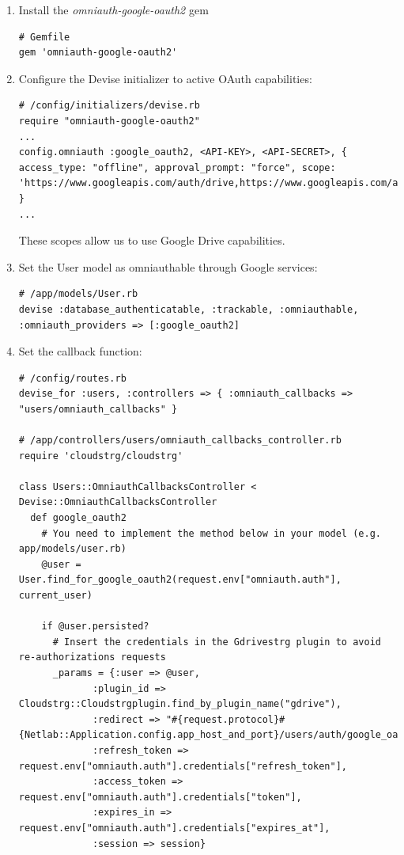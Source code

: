 \documentclass{article}
\begin{document}
\begin{enumerate}
\item Install the \textit{omniauth-google-oauth2} gem
\begin{verbatim}
# Gemfile
gem 'omniauth-google-oauth2'
\end{verbatim}

\item Configure the Devise initializer to active OAuth capabilities:
\begin{verbatim}
# /config/initializers/devise.rb
require "omniauth-google-oauth2"
...
config.omniauth :google_oauth2, <API-KEY>, <API-SECRET>, { access_type: "offline", approval_prompt: "force", scope: 'https://www.googleapis.com/auth/drive,https://www.googleapis.com/auth/drive.file,https://www.googleapis.com/auth/userinfo.email,https://www.googleapis.com/auth/userinfo.profile' }
...
\end{verbatim}

These scopes allow us to use Google Drive capabilities.

\item Set the User model as omniauthable through Google services:
\begin{verbatim}
# /app/models/User.rb
devise :database_authenticatable, :trackable, :omniauthable, :omniauth_providers => [:google_oauth2]
\end{verbatim}

\item Set the callback function:
\begin{verbatim}
# /config/routes.rb
devise_for :users, :controllers => { :omniauth_callbacks => "users/omniauth_callbacks" }

# /app/controllers/users/omniauth_callbacks_controller.rb
require 'cloudstrg/cloudstrg'

class Users::OmniauthCallbacksController < Devise::OmniauthCallbacksController
  def google_oauth2
    # You need to implement the method below in your model (e.g. app/models/user.rb)
    @user = User.find_for_google_oauth2(request.env["omniauth.auth"], current_user)

    if @user.persisted?
      # Insert the credentials in the Gdrivestrg plugin to avoid re-authorizations requests
      _params = {:user => @user, 
             :plugin_id => Cloudstrg::Cloudstrgplugin.find_by_plugin_name("gdrive"), 
             :redirect => "#{request.protocol}#{Netlab::Application.config.app_host_and_port}/users/auth/google_oauth2/callback", 
             :refresh_token => request.env["omniauth.auth"].credentials["refresh_token"], 
             :access_token => request.env["omniauth.auth"].credentials["token"], 
             :expires_in => request.env["omniauth.auth"].credentials["expires_at"], 
             :session => session}
      

\end{verbatim}
\end{enumerate}
\end{document}
